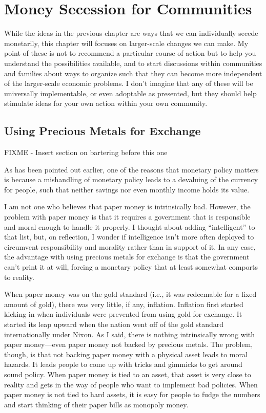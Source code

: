 \chapter{Money Secession for Communities}

While the ideas in the previous chapter are ways that we can
individually secede monetarily, this chapter will focuses on
larger-scale changes we can make. My point of these is not to recommend
a particular course of action but to help you understand the
possibilities available, and to start discussions within communities
and families about ways to organize such that they can become more
independent of the larger-scale economic problems. I don’t imagine that
any of these will be universally implementable, or even adoptable as
presented, but they should help stimulate ideas for your own action
within your own community.

\section{Using Precious Metals for Exchange}

FIXME - Insert section on bartering before this one

As has been pointed out
earlier, one of the reasons that monetary policy matters is because a
mishandling of monetary policy leads to a devaluing of the currency for
people, such that neither savings nor even monthly income holds its
value.

I am not one who believes that paper money is intrinsically bad.
However, the problem with paper money is that it requires a government
that is responsible and moral enough to handle it properly. I thought
about adding “intelligent” to that list, but, on reflection, I wonder
if intelligence isn’t more often deployed to circumvent responsibility
and morality rather than in support of it. In any case, the advantage
with using precious metals for exchange is that the government can’t
print it at will, forcing a monetary policy that at least somewhat
comports to reality.

When paper money was on the gold standard (i.e., it was redeemable for a
fixed amount of gold), there was very little, if any, inflation.
Inflation first started kicking in when individuals were prevented from
using gold for exchange. It started its leap upward when the nation
went off of the gold standard internationally under Nixon. As I said,
there is nothing intrinsically wrong with paper money—even paper money
not backed by precious metals. The problem, though, is that not backing
paper money with a physical asset leads to moral hazards. It leads
people to come up with tricks and gimmicks to get around sound policy.
When paper money is tied to an asset, that asset is very close to
reality and gets in the way of people who want to implement bad
policies. When paper money is not tied to hard assets, it is easy for
people to fudge the numbers and start thinking of their paper bills as
monopoly money.

